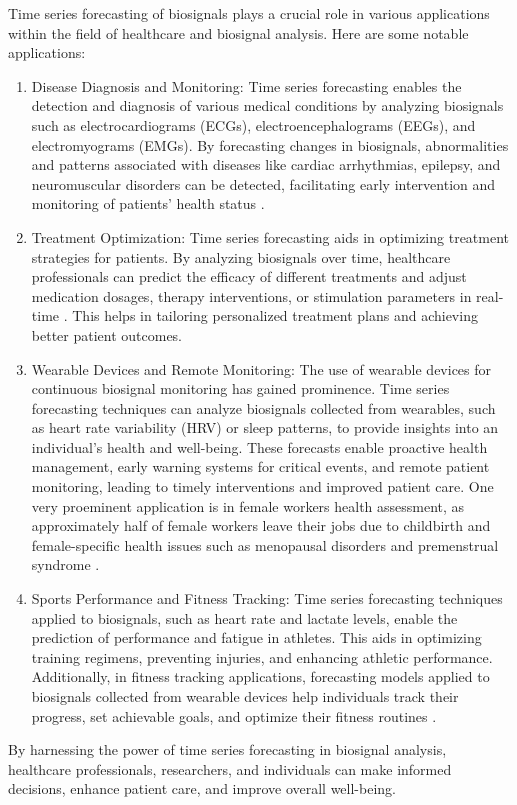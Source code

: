 \documentclass[../main.tex]{subfiles}
\begin{document}
        Time series forecasting of biosignals plays a crucial role in various applications within the field of healthcare and biosignal analysis. Here are some notable applications:

        \begin{enumerate}
            \item Disease Diagnosis and Monitoring: Time series forecasting enables the detection and diagnosis of various medical conditions by analyzing biosignals such as electrocardiograms (ECGs), electroencephalograms (EEGs), and electromyograms (EMGs). By forecasting changes in biosignals, abnormalities and patterns associated with diseases like cardiac arrhythmias, epilepsy, and neuromuscular disorders can be detected, facilitating early intervention and monitoring of patients' health status \cite{cepulionis2016ecgforecast, fan2019, raghunath2020}. 

            \item Treatment Optimization: Time series forecasting aids in optimizing treatment strategies for patients. By analyzing biosignals over time, healthcare professionals can predict the efficacy of different treatments and adjust medication dosages, therapy interventions, or stimulation parameters in real-time \cite{nutini2022}. This helps in tailoring personalized treatment plans and achieving better patient outcomes.
        
            \item Wearable Devices and Remote Monitoring: The use of wearable devices for continuous biosignal monitoring has gained prominence. Time series forecasting techniques can analyze biosignals collected from wearables, such as heart rate variability (HRV) or sleep patterns, to provide insights into an individual's health and well-being. These forecasts enable proactive health management, early warning systems for critical events, and remote patient monitoring, leading to timely interventions and improved patient care. One very proeminent application is in female workers health assessment, as approximately half of female workers leave their jobs due to childbirth and female-specific health issues such as menopausal disorders and premenstrual syndrome \cite{schoep2019women}.
        
            \item Sports Performance and Fitness Tracking: Time series forecasting techniques applied to biosignals, such as heart rate and lactate levels, enable the prediction of performance and fatigue in athletes. This aids in optimizing training regimens, preventing injuries, and enhancing athletic performance. Additionally, in fitness tracking applications, forecasting models applied to biosignals collected from wearable devices help individuals track their progress, set achievable goals, and optimize their fitness routines \cite{stuart2022mn, ZhaoriGetu2022}.
        \end{enumerate}

        By harnessing the power of time series forecasting in biosignal analysis, healthcare professionals, researchers, and individuals can make informed decisions, enhance patient care, and improve overall well-being.
\end{document}
